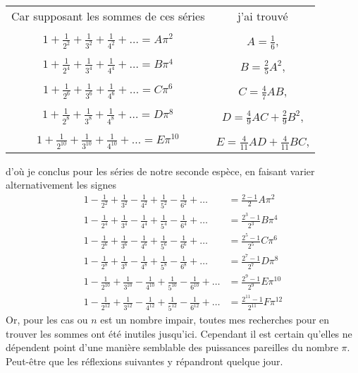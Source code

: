 \documentclass[12pt]{article}
\theoremstyle{definition}
\begin{document}
\begin{center}
\begin{tabular}{ c|c } 
Car supposant les sommes de ces séries & j'ai trouvé \\ 
& \\
$\displaystyle1 + \frac{1}{2^2} + \frac{1}{3^2} + \frac{1}{4^2} + \dots = A \pi^2$ & $\displaystyle A = \frac{1}{6}$, \\ & \\
$\displaystyle1 + \frac{1}{2^4} + \frac{1}{3^4} + \frac{1}{4^4} + \dots = B \pi^4$ & $\displaystyle B = \frac{2}{5}A^2$, \\ & \\
$\displaystyle1 + \frac{1}{2^6} + \frac{1}{3^6} + \frac{1}{4^6} + \dots = C \pi^6$ & $\displaystyle C = \frac{4}{7}AB$, \\ & \\
$\displaystyle1 + \frac{1}{2^8} + \frac{1}{3^8} + \frac{1}{4^8} + \dots = D \pi^8$ & $\displaystyle D = \frac{4}{9}AC + \frac{2}{9}B^2$, \\ & \\
$\displaystyle1 + \frac{1}{2^{10}} + \frac{1}{3^{10}} + \frac{1}{4^{10}} + \dots = E \pi^{10}$ & $\displaystyle E = \frac{4}{11}AD + \frac{4}{11}BC$,  
\end{tabular}
\end{center}
d'où je conclus pour les séries de notre seconde espèce, en faisant varier alternativement les signes
\begin{align*}
    1 - \frac{1}{2^2} + \frac{1}{3^2} - \frac{1}{4^2} + \frac{1}{5^2} - \frac{1}{6^2} + \dots &= \frac{2-1}{2}A\pi^2 \\
    1 - \frac{1}{2^4} + \frac{1}{3^4} - \frac{1}{4^4} + \frac{1}{5^4} - \frac{1}{6^4} + \dots &= \frac{2^3-1}{2^3}B\pi^4 \\
    1 - \frac{1}{2^6} + \frac{1}{3^6} - \frac{1}{4^6} + \frac{1}{5^6} - \frac{1}{6^6} + \dots &= \frac{2^5-1}{2^5}C\pi^6 \\
    1 - \frac{1}{2^8} + \frac{1}{3^8} - \frac{1}{4^8} + \frac{1}{5^8} - \frac{1}{6^8} + \dots &= \frac{2^7-1}{2^7}D\pi^8 \\
    1 - \frac{1}{2^{10}} + \frac{1}{3^{10}} - \frac{1}{4^{10}} + \frac{1}{5^{10}} - \frac{1}{6^{10}} + \dots &= \frac{2^9-1}{2^9}E\pi^{10} \\
    1 - \frac{1}{2^{12}} + \frac{1}{3^{12}} - \frac{1}{4^{12}} + \frac{1}{5^{12}} - \frac{1}{6^{12}} + \dots &= \frac{2^{11} -1}{2^{11}}F\pi^{12}
\end{align*}
Or, pour les cas ou $n$ est un nombre impair, toutes mes recherches pour en trouver les sommes ont été inutiles jusqu'ici. Cependant il est certain qu'elles ne dépendent point d'une manière semblable des puissances pareilles du nombre $\pi$. Peut-être que les réflexions suivantes y répandront quelque jour.
\end{document}
